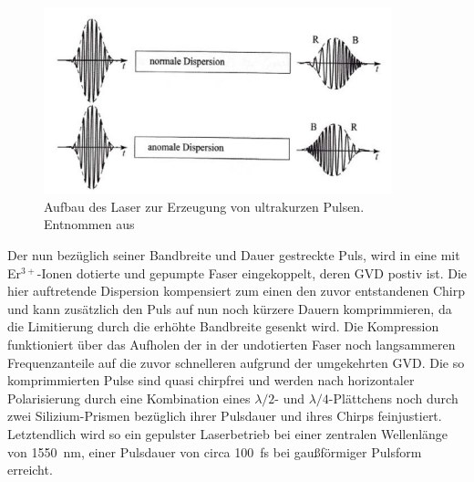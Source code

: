       \FloatBarrier
      \begin{figure}[h]
        \centering
        \includegraphics[width = 0.9\textwidth]{pictures/Dispersion.png}
        \caption{Aufbau des Laser zur Erzeugung von ultrakurzen Pulsen. Entnommen aus \cite{tu_dortmund_versuchsanleitung_nodate}}
        \label{fig:Dispersion}
      \end{figure}
      \FloatBarrier


      Der nun bezüglich seiner Bandbreite und Dauer gestreckte Puls, wird in eine mit Er$^{3+}$-Ionen dotierte und gepumpte Faser eingekoppelt, deren GVD postiv ist. Die hier auftretende Dispersion 
      kompensiert zum einen den zuvor entstandenen Chirp und kann zusätzlich den Puls auf nun noch kürzere Dauern komprimmieren, da die Limitierung durch die erhöhte Bandbreite gesenkt wird. Die
      Kompression funktioniert über das Aufholen der in der undotierten Faser noch langsammeren Frequenzanteile auf die zuvor schnelleren aufgrund der umgekehrten GVD. Die so komprimmierten Pulse sind 
      quasi chirpfrei und werden nach horizontaler Polarisierung durch eine Kombination eines $\lambda/2$- und $\lambda/4$-Plättchens noch durch zwei Silizium-Prismen bezüglich ihrer Pulsdauer und ihres 
      Chirps feinjustiert. Letztendlich wird so ein gepulster Laserbetrieb bei einer zentralen Wellenlänge von \SI{1550}{\nano\metre}, einer Pulsdauer von circa \SI{100}{\femto\second} bei gaußförmiger 
      Pulsform erreicht.  
